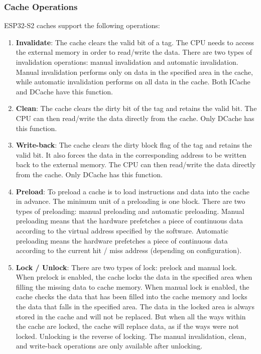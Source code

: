 \documentclass[main\_\_EN.tex]{subfiles}
\begin{document}
\subsubsection{Cache Operations}
ESP32-S2 caches support the following operations:
\begin{enumerate}
\item \textbf{Invalidate}: The cache clears the valid bit of a tag. The CPU needs to access the external memory in order to read/write the data. There are two types of invalidation operations: manual invalidation and automatic invalidation. Manual invalidation performs only on data in the specified area in the cache, while automatic invalidation performs on all data in the cache. Both ICache and DCache have this function.

\item \textbf{Clean}: The cache clears the dirty bit of the tag and retains the valid bit. The CPU can then read/write the data directly from the cache. Only DCache has this function.

\item \textbf{Write-back}: The cache clears the dirty block flag of the tag and retains the valid bit. It also forces the data in the corresponding address to be written back to the external memory. The CPU can then read/write the data directly from the cache. Only DCache has this function.

\item \textbf{Preload}: To preload a cache is to load instructions and data into the cache in advance. The minimum unit of a preloading is one block. There are two types of preloading: manual preloading and automatic preloading. Manual preloading means that the hardware prefetches a piece of continuous data according to the virtual address specified by the software. Automatic preloading means the hardware prefetches a piece of continuous data according to the current hit / miss address (depending on configuration).

\item \textbf{Lock / Unlock}: There are two types of lock: prelock and manual lock. When prelock is enabled, the cache locks the data in the specified area when filling the missing data to cache memory. When manual lock is enabled, the cache checks the data that has been filled into the cache memory and locks the data that falls in the specified area. The data in the locked area is always stored in the cache and will not be replaced. But when all the ways within the cache are locked, the cache will replace data, as if the ways were not locked. Unlocking is the reverse of locking. The manual invalidation, clean, and write-back operations are only available after unlocking.

\end{enumerate}
\end{document}
